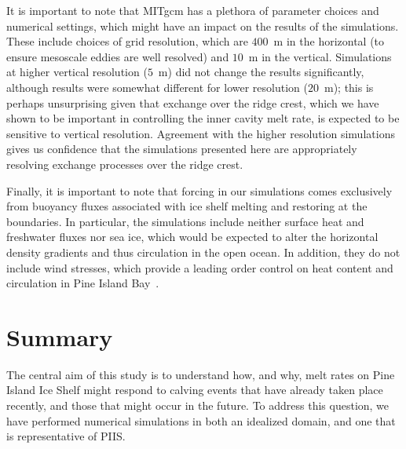 \documentclass[draft]{agujournal2019}
\begin{document}
It is important to note that MITgcm has a plethora of parameter choices and numerical settings, which might have an impact on the results of the simulations. These include choices of grid resolution, which are $400$~m in the horizontal (to ensure mesoscale eddies are well resolved) and $10$~m in the vertical. Simulations at higher vertical resolution ($5$~m) did not change the results significantly, although results were somewhat different for lower resolution ($20$~m); this is perhaps unsurprising given that exchange over the ridge crest, which we have shown to be important in controlling the inner cavity melt rate, is expected to be sensitive to vertical resolution. Agreement with the higher resolution simulations gives us confidence that the simulations presented here are appropriately resolving exchange processes over the ridge crest.

Finally, it is important to note that forcing in our simulations comes exclusively from buoyancy fluxes associated with ice shelf melting and restoring at the boundaries. In particular, the simulations include neither surface heat and freshwater fluxes nor sea ice, which would be expected to alter the horizontal density gradients and thus circulation in the open ocean. In addition, they do not include wind stresses, which provide a leading order control on heat content and circulation in Pine Island Bay~\cite{Dutrieux2014Science}.

\section{Summary}\label{S:Summary}
The central aim of this study is to understand how, and why, melt rates on Pine Island Ice Shelf might respond to calving events that have already taken place recently, and those that might occur in the future. To address this question, we have performed numerical simulations in both an idealized domain, and one that is representative of PIIS.
\end{document}
